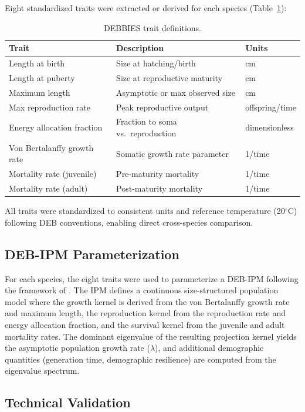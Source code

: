 \documentclass[11pt]{article}
\begin{document}
Eight standardized traits were extracted or derived for each species (Table~\ref{tab:traits}):

\begin{table}[h]
\centering
\caption{DEBBIES trait definitions.}
\label{tab:traits}
\begin{tabular}{lll}
\toprule
Trait & Description & Units \\
\midrule
Length at birth & Size at hatching/birth & cm \\
Length at puberty & Size at reproductive maturity & cm \\
Maximum length & Asymptotic or max observed size & cm \\
Max reproduction rate & Peak reproductive output & offspring/time \\
Energy allocation fraction & Fraction to soma vs.\ reproduction & dimensionless \\
Von Bertalanffy growth rate & Somatic growth rate parameter & 1/time \\
Mortality rate (juvenile) & Pre-maturity mortality & 1/time \\
Mortality rate (adult) & Post-maturity mortality & 1/time \\
\bottomrule
\end{tabular}
\end{table}

All traits were standardized to consistent units and reference temperature (20$^\circ$C) following DEB conventions, enabling direct cross-species comparison.

\subsection{DEB-IPM Parameterization}

For each species, the eight traits were used to parameterize a DEB-IPM following the framework of \citet{smallegange2017}. The IPM defines a continuous size-structured population model where the growth kernel is derived from the von Bertalanffy growth rate and maximum length, the reproduction kernel from the reproduction rate and energy allocation fraction, and the survival kernel from the juvenile and adult mortality rates. The dominant eigenvalue of the resulting projection kernel yields the asymptotic population growth rate ($\lambda$), and additional demographic quantities (generation time, demographic resilience) are computed from the eigenvalue spectrum.

\subsection{Technical Validation}
\end{document}
